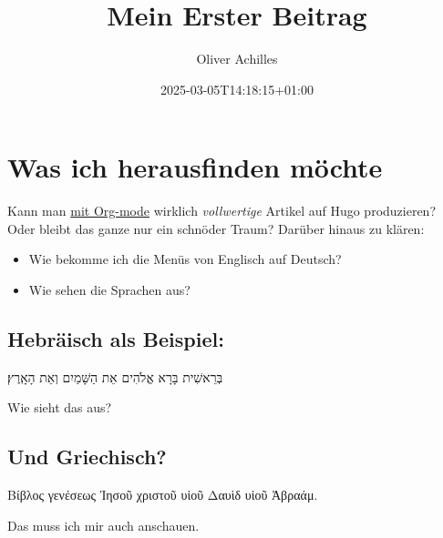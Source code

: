 \documentclass[11pt]{article}
\author{Oliver Achilles}
\date{2025-03-05T14:18:15+01:00}
\title{Mein Erster Beitrag}
\begin{document}
\maketitle
\tableofcontents

\section{Was ich herausfinden möchte}
\label{sec:org07211c9}

Kann man \href{https://orgmode.org/}{mit Org-mode} wirklich \emph{vollwertige} Artikel auf Hugo produzieren? Oder bleibt das ganze nur ein schnöder Traum?
Darüber hinaus zu klären:
\begin{itemize}
\item Wie bekomme ich die Menüs von Englisch auf Deutsch?
\item Wie sehen die Sprachen aus?
\end{itemize}
\subsection{Hebräisch als Beispiel:}
\label{sec:org5dfd299}

בְּרֵאשִׁית בָּרָא אֱלֹהִים אֵת הַשָּׁמַיִם וְאֵת הָאָֽרֶץ׃ 


Wie sieht das aus?
\subsection{Und Griechisch?}
\label{sec:org6755737}
Βίβλος γενέσεως Ἰησοῦ χριστοῦ υἱοῦ Δαυὶδ υἱοῦ Ἀβραάμ.

Das muss ich mir auch anschauen.
\end{document}
